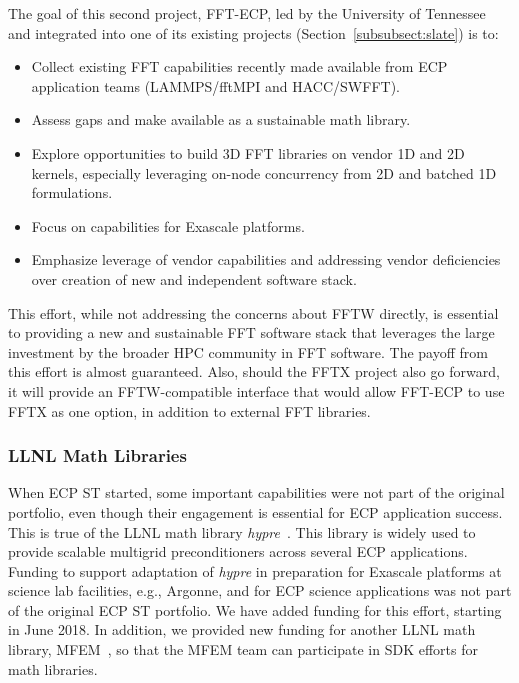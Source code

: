 The goal of this second project, FFT-ECP, led by the University of Tennessee and integrated into one of its existing projects (Section~\ref{subsubsect:slate}) is to:
\begin{itemize}
\item Collect existing FFT capabilities recently made available from ECP application teams (LAMMPS/fftMPI and HACC/SWFFT). 
\item Assess gaps and make available as a sustainable math library.
\item Explore opportunities to build 3D FFT libraries on vendor 1D and 2D kernels, especially leveraging on-node concurrency from 2D and batched 1D formulations.
\item Focus on capabilities for Exascale platforms.
\item Emphasize leverage of vendor capabilities and addressing vendor deficiencies over creation of new and independent software stack.
\end{itemize}

This effort, while not addressing the concerns about FFTW directly, is essential to providing a new and sustainable FFT software stack that leverages the large investment by the broader HPC community in FFT software.  The payoff from this effort is almost guaranteed.  Also, should the FFTX project also go forward, it will provide an FFTW-compatible interface that would allow FFT-ECP to use FFTX as one option, in addition to external FFT libraries.

\subsubsection{LLNL Math Libraries}\label{subsubsect:llnl-math-libs}
When ECP ST started, some important capabilities were not part of the original portfolio, even though their engagement is essential for ECP application success.  This is true of the LLNL math library \textit{hypre}~\cite{hypre}.  This library is widely used to provide scalable multigrid preconditioners across several ECP applications.  Funding to support adaptation of \textit{hypre}  in preparation for Exascale platforms at science lab facilities, e.g., Argonne, and for ECP science applications was not part of the original ECP ST portfolio.  We have added funding for this effort, starting in June 2018.  In addition, we provided new funding for another LLNL math library, MFEM~\cite{mfem:homepage}, so that the MFEM team can participate in SDK efforts for math libraries.